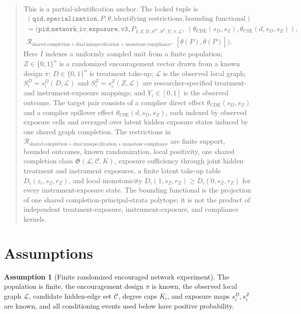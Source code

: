 \documentclass[11pt]{article}
\theoremstyle{definition}
\newtheorem{assumption}{Assumption}
\theoremstyle{plain}
\theoremstyle{remark}
\begin{document}
\begin{quote}\small
This is a partial-identification anchor. The locked tuple is
\[
\begin{gathered}
(\texttt{qid},\texttt{specialization},P,\theta,\text{identifying restrictions},
\text{bounding functional})\\
=
(\texttt{pid\_network\_iv\_exposure},\texttt{v3},
P_{I,Z,D,S^D,S^Z,Y;\,\pi,\mathcal L},
\ (\theta_{\mathrm{CDE}}(s_D,s_Z),\theta_{\mathrm{CSE}}(d,s_D,s_Z)),\\
\mathcal{R}_{\mathrm{shared\ completion+dual\ misspecification+monotone\ compliance}},
\ [\underline\theta(P),\overline\theta(P)]) .
\end{gathered}
\]
Here \(I\) indexes a uniformly sampled unit from a finite population; \(Z\in\{0,1\}^n\) is a randomized encouragement vector drawn from a known design \(\pi\); \(D\in\{0,1\}^n\) is treatment take-up; \(\mathcal L\) is the observed local graph; \(S_i^D=s_i^D(D,\mathcal L)\) and \(S_i^Z=s_i^Z(Z,\mathcal L)\) are researcher-specified treatment- and instrument-exposure mappings; and \(Y_i\in[0,1]\) is the observed outcome. The target pair consists of a complier direct effect \(\theta_{\mathrm{CDE}}(s_D,s_Z)\) and a complier spillover effect \(\theta_{\mathrm{CSE}}(d,s_D,s_Z)\), each indexed by observed exposure cells and averaged over latent hidden exposure states induced by one shared graph completion. The restrictions in \(\mathcal{R}_{\mathrm{shared\ completion+dual\ misspecification+monotone\ compliance}}\) are finite support, bounded outcomes, known randomization, local positivity, one shared completion class \(\mathfrak G(\mathcal L,\mathcal C,K)\), exposure sufficiency through joint hidden treatment and instrument exposures, a finite latent take-up table \(D_i(z_i,s_Z,r_Z)\), and local monotonicity \(D_i(1,s_Z,r_Z)\ge D_i(0,s_Z,r_Z)\) for every instrument-exposure state. The bounding functional is the projection of one shared completion-principal-strata polytope; it is not the product of independent treatment-exposure, instrument-exposure, and compliance kernels.
\end{quote}

\section{Assumptions}
\begin{assumption}[Finite randomized encouraged network experiment]\label{ass:finite}
The population is finite, the encouragement design \(\pi\) is known, the observed local graph \(\mathcal L\), candidate hidden-edge set \(\mathcal C\), degree caps \(K_i\), and exposure maps \(s_i^D,s_i^Z\) are known, and all conditioning events used below have positive probability.
\end{assumption}
\end{document}
